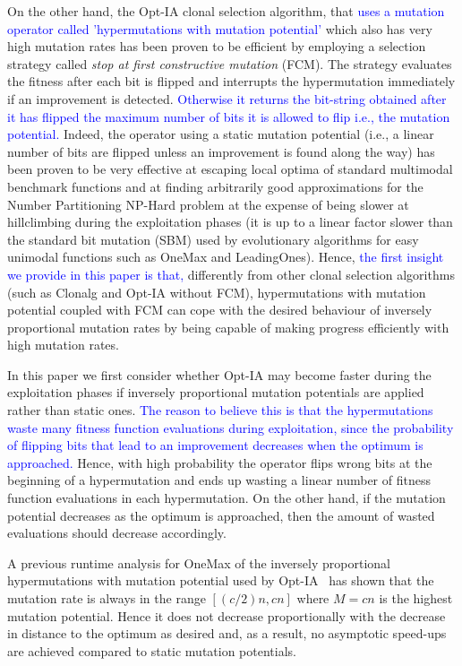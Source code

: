 \documentclass[lettersize,journal]{IEEEtran}
\newcommand{\new}[1]{\textcolor{blue}{#1}}
\begin{document}
On the other hand, the Opt-IA clonal selection algorithm, that \new{uses a mutation operator called 'hypermutations with mutation potential'} which also has very high mutation rates has been proven to be efficient by employing a selection strategy called {\it stop at first constructive mutation} (FCM). The strategy evaluates the fitness after each bit is flipped and interrupts the hypermutation immediately if an improvement is detected. \new {Otherwise it returns the bit-string obtained after it has flipped the maximum number of  bits it is allowed to flip i.e., the mutation potential.} 
Indeed, the operator using a static mutation potential (i.e., a linear number of bits are flipped unless an improvement is found along the way) has been proven to be very effective at escaping local
optima of standard multimodal benchmark functions \cite{CorusOlivetoYazdaniGECCO2017} and at finding arbitrarily good approximations for the Number Partitioning NP-Hard problem \cite{CorusOlivetoYazdaniPPSN2018Approx,CorusOlivetoYazdaniAIJ2019} at the expense
of being slower at hillclimbing during the exploitation phases (it is up to a linear factor slower than the standard bit mutation (SBM) used by evolutionary algorithms for easy unimodal functions such as OneMax and LeadingOnes).
Hence, \new{the first insight we provide in this paper is that,} differently from other clonal selection algorithms (such as Clonalg and Opt-IA without FCM), hypermutations with mutation potential coupled with FCM can cope with the desired behaviour of inversely proportional mutation rates by being capable of making progress efficiently with high mutation rates. %

In this paper we first consider whether Opt-IA may become faster during the exploitation phases if inversely proportional mutation potentials are applied rather than static ones.
\new{The reason to believe this is that the hypermutations waste many fitness function evaluations during exploitation, since the probability of flipping bits that lead to an improvement decreases when the optimum is approached.} 
Hence, with high probability the operator flips wrong bits at the beginning of a hypermutation and ends up wasting a linear number
of fitness function evaluations in each hypermutation. On the other hand, if the mutation potential decreases as the optimum is approached, 
then the amount of wasted evaluations should decrease accordingly.

A previous runtime analysis for OneMax of the inversely proportional hypermutations with mutation potential used by Opt-IA~\cite{JansenZarges2011} has shown that the mutation rate is always in the range $[(c/2)n, cn]$ where $M=cn$ is the highest mutation potential. Hence it does not decrease proportionally with the decrease in distance to the optimum as desired and, as a result, no asymptotic speed-ups are achieved compared to static mutation potentials. 
\end{document}

